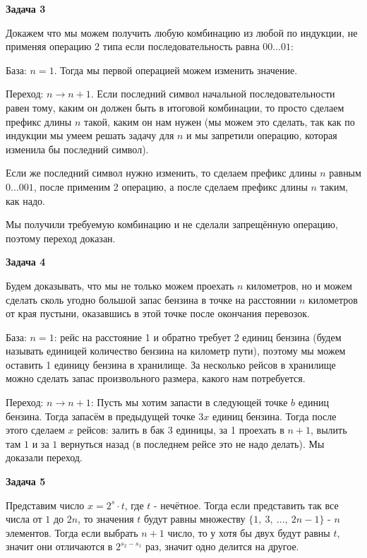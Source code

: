 \begin{center}
    \textbf{Задача 3}
\end{center}
Докажем что мы можем получить любую комбинацию из любой по индукции, не применяя операцию 2 типа если последовательность равна $\displaystyle 00...01$:

База: $\displaystyle n=1$. Тогда мы первой операцией можем изменить значение.

Переход: $\displaystyle n\rightarrow n+1$. Если последний символ начальной последовательности равен тому, каким он должен быть в итоговой комбинации, то просто сделаем префикс длины $\displaystyle n$ такой, каким он нам нужен (мы можем это сделать, так как по индукции мы умеем решать задачу для $\displaystyle n$ и мы запретили операцию, которая изменила бы последний символ).

Если же последний символ нужно изменить, то сделаем префикс длины $\displaystyle n$ равным $\displaystyle 0...001$, после применим 2 операцию, а после сделаем префикс длины $\displaystyle n$ таким, как надо.

Мы получили требуемую комбинацию и не сделали запрещённую операцию, поэтому переход доказан.

\begin{center}
    \textbf{Задача 4}
\end{center}
Будем доказывать, что мы не только можем проехать $\displaystyle n$ километров, но и можем сделать сколь угодно большой запас бензина в точке на расстоянии $\displaystyle n$ километров от края пустыни, оказавшись в этой точке после окончания перевозок.

База: $\displaystyle n=1$: рейс на расстояние 1 и обратно требует 2 единиц бензина (будем называть единицей количество бензина на километр пути), поэтому мы можем оставить 1 единицу бензина в хранилище. За несколько рейсов в хранилище можно сделать запас произвольного размера, какого нам потребуется.

Переход: $\displaystyle n\rightarrow n+1$: Пусть мы хотим запасти в следующей точке $\displaystyle b$ единиц бензина. Тогда запасём в предыдущей точке $\displaystyle 3x$ единиц бензина. Тогда после этого сделаем $\displaystyle x$ рейсов: залить в бак 3 единицы, за 1 проехать в $\displaystyle n+1$, вылить там $\displaystyle 1$ и за $\displaystyle 1$ вернуться назад (в последнем рейсе это не надо делать). Мы доказали переход.

\begin{center}
    \textbf{Задача 5}
\end{center}
Представим число $\displaystyle x=2^{s} \cdotp t$, где $\displaystyle t$ - нечётное. Тогда если представить так все числа от $\displaystyle 1$ до $\displaystyle 2n$, то значения $\displaystyle t$ будут равны множеству $\displaystyle \{1,\ 3,\ ...,\ 2n-1\}$ - $\displaystyle n$ элементов. Тогда если выбрать $\displaystyle n+1$ число, то у хотя бы двух будут равны $\displaystyle t$, значит они отличаются в $\displaystyle 2^{s_{2} -s_{1}}$ раз, значит одно делится на другое.

